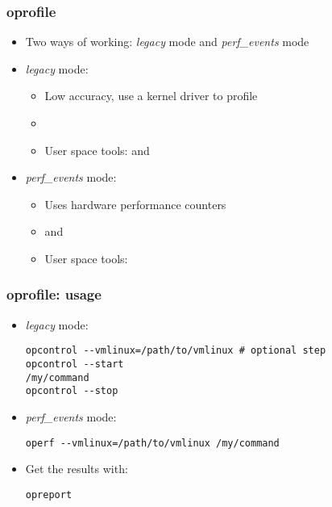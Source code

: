 \begin{frame}
\frametitle{oprofile}
\begin{itemize}
	\item Two ways of working: {\em legacy} mode and {\em
              perf\_events} mode
	\item {\em legacy} mode:
	\begin{itemize}
		\item Low accuracy, use a kernel driver to profile
		\item {}
		\item User space tools:  and 
	\end{itemize}
	\item {\em perf\_events} mode:
	\begin{itemize}
		\item Uses hardware performance counters
		\item {} and 
		\item User space tools: 
	\end{itemize}
\end{itemize}
\end{frame}

\begin{frame}[fragile]
\frametitle{oprofile: usage}
\begin{itemize}
	\item {\em legacy} mode:
	\begin{block}{}
\begin{verbatim}
opcontrol --vmlinux=/path/to/vmlinux # optional step
opcontrol --start
/my/command
opcontrol --stop
\end{verbatim}
	\end{block}
	\item {\em perf\_events} mode:
	\begin{block}{}
\begin{verbatim}
operf --vmlinux=/path/to/vmlinux /my/command
\end{verbatim}
	\end{block}
	\item Get the results with:
	\begin{block}{}
\begin{verbatim}
opreport
\end{verbatim}
	\end{block}
\end{itemize}
\end{frame}

